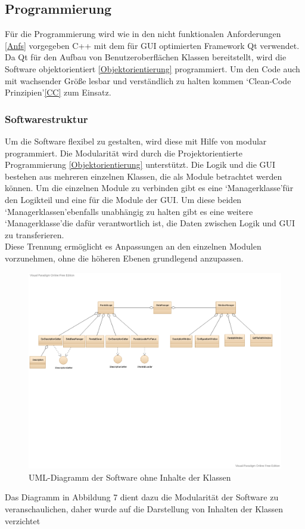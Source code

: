 \documentclass[12pt,a4paper]{article}
\begin{document}
\subsection{Programmierung}
Für die Programmierung wird wie in den nicht funktionalen Anforderungen \ref{Anfs} vorgegeben C++ mit dem für \ac{GUI} optimierten Framework Qt verwendet. \\
Da Qt für den Aufbau von Benutzeroberflächen Klassen bereitstellt, wird die Software objektorientiert \ref{Objektorientierung} programmiert. Um den Code auch mit wachsender Größe lesbar und verständlich zu halten kommen \lq Clean-Code Prinzipien\rq\space\ref{CC} zum Einsatz.\\
\subsubsection{Softwarestruktur}
Um die Software flexibel zu gestalten, wird diese mit Hilfe von modular programmiert. Die Modularität wird durch die Projektorientierte Programmierung \ref{Objektorientierung} unterstützt. Die Logik und die \ac{GUI} bestehen aus mehreren einzelnen Klassen, die als Module betrachtet werden können. Um die einzelnen Module zu verbinden gibt es eine \lq Managerklasse\rq\space für den Logikteil und eine für die Module der \ac{GUI}. Um diese beiden \lq Managerklassen\rq\space ebenfalls unabhängig zu halten gibt es eine weitere \lq Managerklasse\rq\space die dafür verantwortlich ist, die Daten zwischen Logik und \ac{GUI} zu transferieren. \\
Diese Trennung ermöglicht es Anpassungen an den einzelnen Modulen vorzunehmen, ohne die höheren Ebenen grundlegend anzupassen.
\begin{figure}[H]
\includegraphics[page=1,scale=0.6]{pictures_and_research/pdf_files/smallParatabUml.pdf}
\caption{UML-Diagramm der Software ohne Inhalte der Klassen}
\end{figure}\noindent
Das Diagramm in Abbildung 7 dient dazu die Modularität der Software zu veranschaulichen, daher wurde auf die Darstellung von Inhalten der Klassen verzichtet
\end{document}
